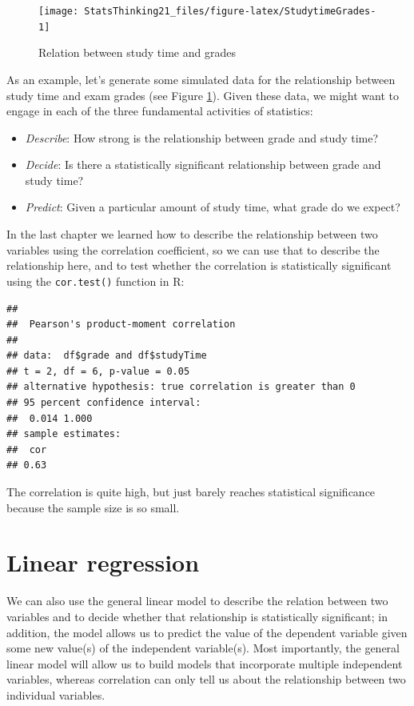 \documentclass[12pt,]{book}
\providecommand{\tightlist}{%
  \setlength{\itemsep}{0pt}\setlength{\parskip}{0pt}}
\theoremstyle{definition}
\theoremstyle{definition}
\theoremstyle{definition}
\theoremstyle{remark}
\begin{document}
\begin{figure}
\texttt{[image: StatsThinking21\_files/figure-latex/StudytimeGrades-1]} \caption{Relation between study time and grades}\label{fig:StudytimeGrades}
\end{figure}

As an example, let's generate some simulated data for the relationship between study time and exam grades (see Figure \ref{fig:StudytimeGrades}). Given these data, we might want to engage in each of the three fundamental activities of statistics:

\begin{itemize}
\tightlist
\item
  \emph{Describe}: How strong is the relationship between grade and study time?
\item
  \emph{Decide}: Is there a statistically significant relationship between grade and study time?
\item
  \emph{Predict}: Given a particular amount of study time, what grade do we expect?
\end{itemize}

In the last chapter we learned how to describe the relationship between two variables using the correlation coefficient, so we can use that to describe the relationship here, and to test whether the correlation is statistically significant using the \texttt{cor.test()} function in R:

\begin{verbatim}
## 
##  Pearson's product-moment correlation
## 
## data:  df$grade and df$studyTime
## t = 2, df = 6, p-value = 0.05
## alternative hypothesis: true correlation is greater than 0
## 95 percent confidence interval:
##  0.014 1.000
## sample estimates:
##  cor 
## 0.63
\end{verbatim}

The correlation is quite high, but just barely reaches statistical significance because the sample size is so small.

\hypertarget{linear-regression}{%
\section{Linear regression}\label{linear-regression}}

We can also use the general linear model to describe the relation between two variables and to decide whether that relationship is statistically significant; in addition, the model allows us to predict the value of the dependent variable given some new value(s) of the independent variable(s). Most importantly, the general linear model will allow us to build models that incorporate multiple independent variables, whereas correlation can only tell us about the relationship between two individual variables.
\end{document}
